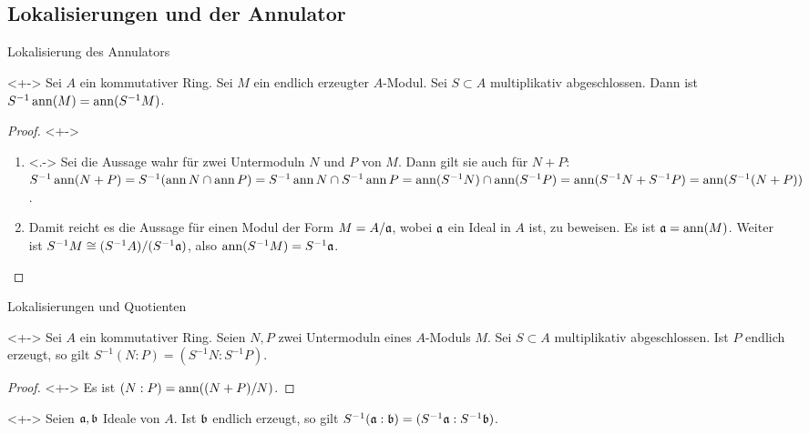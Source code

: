 \subsection{Lokalisierungen und der Annulator}

\begin{frame}{Lokalisierung des Annulators}
	\begin{proposition}<+->
		Sei \(A\) ein kommutativer Ring. Sei \(M\) ein endlich erzeugter \(A\)-Modul. Sei \(S \subset A\) multiplikativ abgeschlossen.
		Dann ist \(S^{-1} \operatorname{ann}(M) = \operatorname{ann}(S^{-1} M)\).
	\end{proposition}
	\begin{proof}<+->
		\begin{enumerate}[<+->]
		\item<.->
			Sei die Aussage wahr für zwei Untermoduln \(N\) und \(P\) von \(M\). Dann gilt sie auch für \(N + P\):
			\(S^{-1} \operatorname{ann}(N + P) = S^{-1} (\operatorname{ann} N \cap \operatorname{ann} P) = S^{-1} \operatorname{ann} N \cap S^{-1} \operatorname{ann} P
			= \operatorname{ann}(S^{-1} N) \cap \operatorname{ann}(S^{-1} P) = \operatorname{ann}(S^{-1} N + S^{-1} P) = \operatorname{ann}(S^{-1} (N + P))\).
		\item
			Damit reicht es die Aussage für einen Modul der Form \(M = A/\mathfrak{a}\), wobei \(\mathfrak{a}\) ein Ideal in \(A\) ist,
			zu beweisen. Es ist \(\mathfrak{a} = \operatorname{ann}(M)\). Weiter ist \(S^{-1} M \cong (S^{-1} A)/(S^{-1} \mathfrak{a})\), also
			\(\operatorname{ann}(S^{-1} M) = S^{-1} \mathfrak{a}\).
			\qedhere
		\end{enumerate}
	\end{proof}
\end{frame}

\begin{frame}{Lokalisierungen und Quotienten}
	\begin{corollary}<+->
		Sei \(A\) ein kommutativer Ring. Seien \(N, P\) zwei Untermoduln eines \(A\)-Moduls \(M\). Sei \(S \subset A\) multiplikativ abgeschlossen.
		Ist \(P\) endlich erzeugt, so gilt \(S^{-1} (N : P) = (S^{-1} N : S^{-1} P)\).
	\end{corollary}
	\begin{proof}<+->
		Es ist \((N : P) = \operatorname{ann}((N + P)/N)\).
	\end{proof}
	\begin{example}<+->
		Seien \(\mathfrak{a}, \mathfrak{b}\) Ideale von \(A\). Ist \(\mathfrak{b}\) endlich erzeugt, so gilt
		\(S^{-1} (\mathfrak{a} : \mathfrak{b}) = (S^{-1} \mathfrak{a} : S^{-1} \mathfrak{b})\).
	\end{example}
\end{frame}

